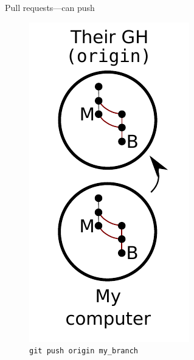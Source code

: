 \begin{frame}{Pull requests---can push}
  \begin{figure}
    \includegraphics{push_010.pdf}
    \\ \texttt{git push origin my\_branch}
    \\ \texttt{}
  \end{figure}
\end{frame}

